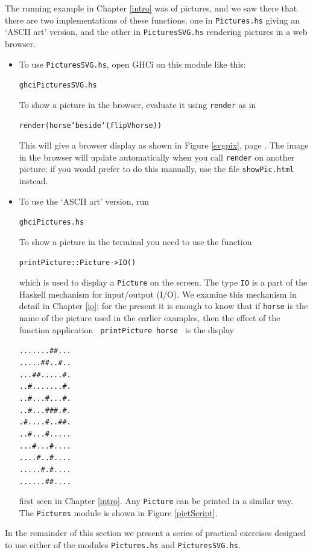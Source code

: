 The running example in Chapter \ref{intro} was of pictures, and we saw there that there are two implementations of these functions, one in \texttt{Pictures.hs} giving an `ASCII art' version, and the other in \texttt{PicturesSVG.hs} rendering pictures in a web browser.\label{ShowBrowser}
\begin{itemize}
\item
To use \texttt{PicturesSVG.hs}, open GHCi on this module like this:
\begin{alltt}
ghci PicturesSVG.hs
\end{alltt}
To show a picture in the browser, evaluate it using \texttt{render} as in 
\begin{alltt}
render (horse `beside` (flipV horse))
\end{alltt}
This will give a browser display as shown in Figure \ref{svgpix}, page \pageref{svgpix}. The image in the browser will update automatically when you call \texttt{render} on another picture; if you would prefer to do this manually, use the file \texttt{showPic.html} instead.

\item
To use the `ASCII art' version, run
\begin{alltt}
ghci Pictures.hs
\end{alltt}
To show a picture in the terminal you need to use the function
\begin{alltt}
printPicture :: Picture -> IO ()
\end{alltt}
which is used to display a \texttt{Picture} on the screen. The type
\texttt{IO} is a part of the Haskell mechanism for input/output
(I/O).
We examine this mechanism in detail in Chapter \ref{io}; for
the present it is enough to know that if \texttt{horse} is the name of the
picture used in the earlier examples, then the effect of the function application
\texttt{\ printPicture horse\ } 
is the display
\begin{center}
{\footnotesize
\newlength{\blah}
\begin{minipage}{\blah}
\begin{alltt} 
.......##... 
.....##..#..
...##.....#.
..#.......#.
..#...#...#.
..#...###.#.
.#....#..##.
..#...#.....
...#...#....
....#..#....
.....#.#....
......##....
\end{alltt}
\end{minipage}
}
\end{center}
first seen in Chapter \ref{intro}. Any \texttt{Picture} can be printed
in a similar way. 
The \texttt{Pictures} module is shown in Figure \ref{pictScript}.
\end{itemize}
In the remainder of this section we present a series of practical
exercises designed to use either of the modules
\texttt{Pictures.hs} and \texttt{PicturesSVG.hs}.


